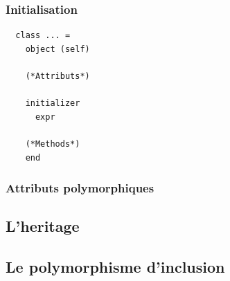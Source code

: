 \begin{frame}[fragile]
	\frametitle{Initialisation}
	\begin{lstlisting}
  class ... =
    object (self)
    
    (*Attributs*)
    
    initializer
      expr
    
    (*Methods*)
    end
	\end{lstlisting}
\end{frame}

\begin{frame}
	\frametitle{Attributs polymorphiques}
	
\end{frame}

\subsection{L'heritage} %
\begin{frame}

\end{frame}

\subsection{Le polymorphisme d'inclusion} %
\begin{frame}

\end{frame}
